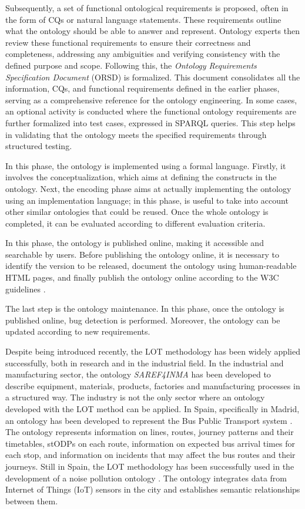Subsequently, a set of functional ontological requirements is proposed, often in the form of CQs or natural language statements.
These requirements outline what the ontology should be able to answer and represent. 
Ontology experts then review these functional requirements to ensure their correctness and completeness, addressing any ambiguities and verifying consistency with the defined purpose and scope.
Following this, the \textit{Ontology Requirements Specification Document} (ORSD) is formalized.
This document consolidates all the information, CQs, and functional requirements defined in the earlier phases, serving as a comprehensive reference for the ontology engineering. 
In some cases, an optional activity is conducted where the functional ontology requirements are further formalized into test cases, expressed in SPARQL queries.
This step helps in validating that the ontology meets the specified requirements through structured testing.

In this phase, the ontology is implemented using a formal language.
Firstly, it involves the conceptualization, which aims at defining the constructs in the ontology.
Next, the encoding phase aims at actually implementing the ontology using an implementation language; in this phase, is useful to take into account other similar ontologies that could be reused.
Once the whole ontology is completed, it can be evaluated according to different evaluation criteria.

In this phase, the ontology is published online, making it accessible and searchable by users. 
Before publishing the ontology online, it is necessary to identify the version to be released, document the ontology using human-readable HTML pages, and finally publish the ontology online according to the W3C guidelines \cite{ontology_online}.

The last step is the ontology maintenance.
In this phase, once the ontology is published online, bug detection is performed.
Moreover, the ontology can be updated according to new requirements.

Despite being introduced recently, the LOT methodology has been widely applied successfully, both in research and in the industrial field.
In the industrial and manufacturing sector, the ontology \textit{SAREF4INMA} \cite{de2020saref4inma} has been developed to describe equipment, materials, products, factories and manufacturing processes in a structured way. 
The industry is not the only sector where an ontology developed with the LOT method can be applied.
In Spain, specifically in Madrid, an ontology has been developed to represent the Bus Public Transport system \cite{ruckhaus2023applying}. 
The ontology represents information on lines, routes, journey patterns and their timetables, stODPs on each route, information on expected bus arrival times for each stop, and information on incidents that may affect the bus routes and their journeys.
Still in Spain, the LOT methodology has been successfully used in the development of a noise pollution ontology \cite{espinoza2020using}.
The ontology integrates data from Internet of Things (IoT) sensors in the city and establishes semantic relationships between them.

